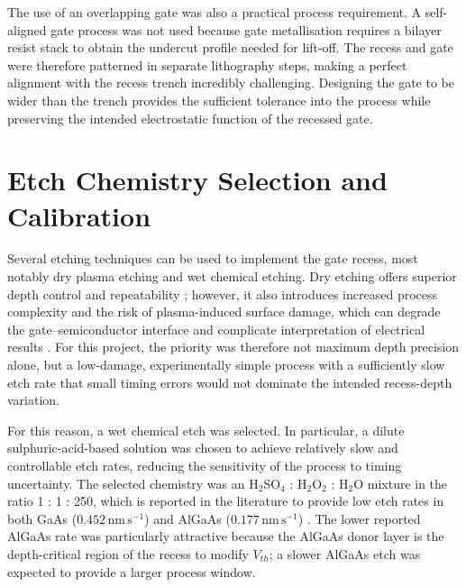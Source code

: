 \vspace{5mm}



\vspace{1mm}

The use of an overlapping gate was also a practical process requirement. A
self-aligned gate process was not used because gate
metallisation requires a bilayer resist stack to obtain the undercut profile
needed for lift-off. The recess and gate were therefore patterned in separate
lithography steps, making a perfect alignment with the recess trench incredibly challenging. 
Designing the gate to be wider than the trench provides the sufficient tolerance 
into the process while preserving the intended electrostatic function of 
the recessed gate.

\vspace{1mm}

\section{Etch Chemistry Selection and Calibration}

Several etching techniques can be used to implement the gate recess, most
notably dry plasma etching and wet chemical etching. Dry etching offers
superior depth control and repeatability \cite{Cadence2024}; however, it
also introduces increased process complexity and the risk of plasma-induced
surface damage, which can degrade the gate--semiconductor interface and
complicate interpretation of electrical results \cite{ZAPPE1993227}. For
this project, the priority was therefore not maximum depth precision alone,
but a low-damage, experimentally simple process with a sufficiently slow
etch rate that small timing errors would not dominate the intended
recess-depth variation.

\vspace{1mm}

For this reason, a wet chemical etch was selected. In particular, a dilute
sulphuric-acid-based solution was chosen to achieve relatively slow and
controllable etch rates, reducing the sensitivity of the process to timing
uncertainty. The selected chemistry was an H$_2$SO$_4$ : H$_2$O$_2$ :
H$_2$O mixture in the ratio 1 : 1 : 250, which is reported in the
literature to provide low etch rates in both GaAs
($0.452\,\mathrm{nm\,s}^{-1}$) and AlGaAs
($0.177\,\mathrm{nm\,s}^{-1}$) \cite{guan_etching}. The lower reported
AlGaAs rate was particularly attractive because the AlGaAs donor layer is the
depth-critical region of the recess to modify $V_{th}$; a slower AlGaAs etch
was expected to provide a larger process window. 

